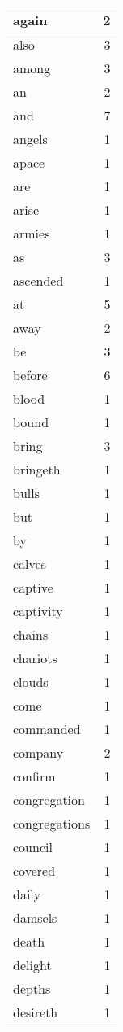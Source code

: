 \begin{center}
\begin{longtable}{l|r}
again & 2 \\ \hline
also & 3 \\ \hline
among & 3 \\ \hline
an & 2 \\ \hline
and & 7 \\ \hline
angels & 1 \\ \hline
apace & 1 \\ \hline
are & 1 \\ \hline
arise & 1 \\ \hline
armies & 1 \\ \hline
as & 3 \\ \hline
ascended & 1 \\ \hline
at & 5 \\ \hline
away & 2 \\ \hline
be & 3 \\ \hline
before & 6 \\ \hline
blood & 1 \\ \hline
bound & 1 \\ \hline
bring & 3 \\ \hline
bringeth & 1 \\ \hline
bulls & 1 \\ \hline
but & 1 \\ \hline
by & 1 \\ \hline
calves & 1 \\ \hline
captive & 1 \\ \hline
captivity & 1 \\ \hline
chains & 1 \\ \hline
chariots & 1 \\ \hline
clouds & 1 \\ \hline
come & 1 \\ \hline
commanded & 1 \\ \hline
company & 2 \\ \hline
confirm & 1 \\ \hline
congregation & 1 \\ \hline
congregations & 1 \\ \hline
council & 1 \\ \hline
covered & 1 \\ \hline
daily & 1 \\ \hline
damsels & 1 \\ \hline
death & 1 \\ \hline
delight & 1 \\ \hline
depths & 1 \\ \hline
desireth & 1 \\ \hline

\end{longtable}
\end{center}
